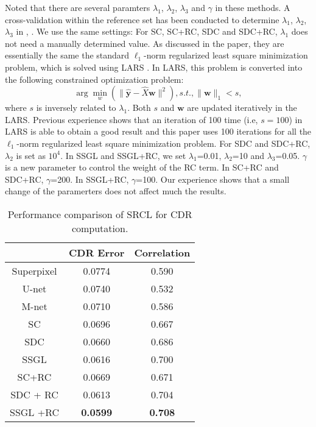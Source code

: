 \documentclass[journal]{IEEEtran}
\begin{document}
Noted that there are several paramters $\lambda_1$, $\lambda_2$, $\lambda_3$ and $\gamma$ in
these methods. A cross-validation within the reference set
has been conducted to determine  $\lambda_1$, $\lambda_2$, $\lambda_3$ in \cite{CJ15}, \cite{Cheng:17BOE}. We
use the same settings: For SC, SC+RC, SDC and SDC+RC, $\lambda_1$ does not need a manually determined value. As discussed
in the paper, they are essentially the same the standard $\ell_1$-norm regularized least square minimization problem, which is
solved using LARS \cite{lars2004}. In LARS, this problem is converted
into the following constrained optimization problem:
 \begin{equation}
\arg \min_{w} (\|\hat{\textbf{y}}-\hat{X}\textbf{w} \|^2), s.t., \|\textbf{w} \|_1 < s,
	\end{equation}
  where $s$ is inversely related to $\lambda_1$. Both $s$ and $\textbf{w}$ are updated
 iteratively in the LARS. Previous experience \cite{CJ15} shows that
 an iteration of 100 time (i.e, $s=100$) in LARS is able to obtain
a good result and this paper uses 100 iterations for all the $\ell_1$-norm regularized least square minimization problem.
For SDC and SDC+RC, $\lambda_2$ is set as $10^4$.
In SSGL and SSGL+RC, we
 set $\lambda_1$=0.01, $\lambda_2$=10 and $\lambda_3$=0.05.
$\gamma$ is a new parameter to
control the weight of the RC term. In SC+RC and SDC+RC,
$\gamma$=200. In SSGL+RC,
$\gamma$=100. Our experience shows that a
small change of the paramerters does not affect much the
results.
\begin{table}
  \caption{ Performance comparison of SRCL for   CDR computation.
} \begin{center}
        \begin{tabular}{c|c|c   } \hline
     & {CDR Error}  &    Correlation
               \\\hline
         	Superpixel \cite{tmi2013} & 0.0774 & 0.590 \\ \hline
         U-net \cite{Ronneberger2015}  & 0.0740  & 0.532  \\ \hline
         M-net \cite{huazhu18} & 0.0710  &  0.586 \\ \hline
             SC \cite{sparsecoding}   & 0.0696& 0.667       \\\hline

                       SDC \cite{CJ15}  & 0.0660  &    0.686         \\\hline
                     SSGL \cite{Cheng:17BOE} & 0.0616 & 0.700 \\\hline
                        SC+RC & 0.0669  & 0.671    \\ \hline
                           SDC + RC  &  0.0613    &    0.704        \\\hline
                SSGL +RC & \textbf{0.0599}  & \textbf{0.708}  \\\hline
        \end{tabular}
    \end{center}
 \label{table1}
\end{table}
\end{document}
